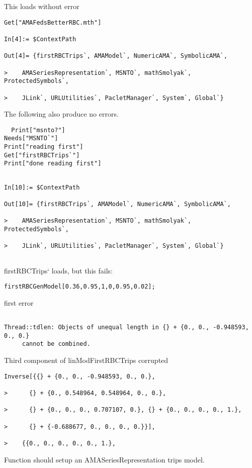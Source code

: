 \documentclass[hyperref]{labbook}
\begin{document}
\begin{description}[style=nextline]
\item[AMAFedsBetterRBC.mth]

This loads without error
\begin{verbatim}
Get["AMAFedsBetterRBC.mth"]

In[4]:= $ContextPath

Out[4]= {firstRBCTrips`, AMAModel`, NumericAMA`, SymbolicAMA`, 
 
>    AMASeriesRepresentation`, MSNTO`, mathSmolyak`, ProtectedSymbols`, 
 
>    JLink`, URLUtilities`, PacletManager`, System`, Global`}

\end{verbatim}


The following also produce no errors.

\begin{verbatim}
  Print["msnto?"]
Needs["MSNTO`"]
Print["reading first"]
Get["firstRBCTrips`"]
Print["done reading first"]
\end{verbatim}
\end{description}


\begin{verbatim}

In[10]:= $ContextPath

Out[10]= {firstRBCTrips`, AMAModel`, NumericAMA`, SymbolicAMA`, 
 
>    AMASeriesRepresentation`, MSNTO`, mathSmolyak`, ProtectedSymbols`, 
 
>    JLink`, URLUtilities`, PacletManager`, System`, Global`}


\end{verbatim}

firstRBCTrips` loads, but this fails:
\begin{verbatim}
firstRBCGenModel[0.36,0.95,1,0,0.95,0.02];
\end{verbatim}

first error
\begin{verbatim}

Thread::tdlen: Objects of unequal length in {} + {0., 0., -0.948593, 0., 0.}
     cannot be combined.

\end{verbatim}

Third component of linModFirstRBCTrips corrupted
\begin{verbatim}
Inverse[{{} + {0., 0., -0.948593, 0., 0.}, 
 
>      {} + {0., 0.548964, 0.548964, 0., 0.}, 
 
>      {} + {0., 0., 0., 0.707107, 0.}, {} + {0., 0., 0., 0., 1.}, 
 
>      {} + {-0.688677, 0., 0., 0., 0.}}], 
 
>    {{0., 0., 0., 0., 0., 1.}, 
\end{verbatim}
Function should setup an AMASeriesRepresentation trips model.
\end{document}
